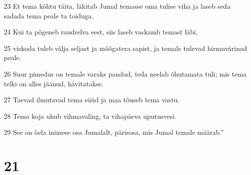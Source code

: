 \par 23 Et tema kõhtu täita, läkitab Jumal temasse oma tulise viha ja laseb seda sadada tema peale ta toiduga.
\par 24 Kui ta põgeneb raudrelva eest, siis laseb vaskamb temast läbi,
\par 25 viskoda tuleb välja seljast ja mõõgatera sapist, ja temale tulevad hirmuvärinad peale.
\par 26 Suur pimedus on temale varaks pandud, teda neelab õhutamata tuli; mis tema telki on alles jäänud, hävitatakse.
\par 27 Taevad ilmutavad tema süüd ja maa tõuseb tema vastu.
\par 28 Tema koja uhub vihmavaling, ta vihapäeva uputusvesi.
\par 29 See on õela inimese osa Jumalalt, pärisosa, mis Jumal temale määrab.”

\chapter{21}

